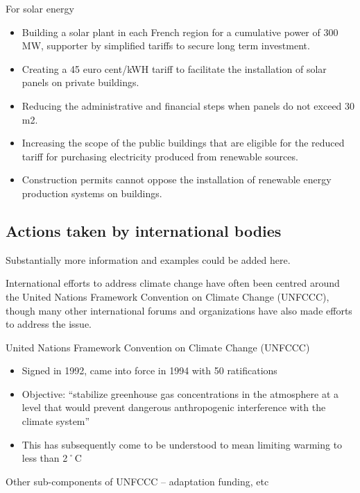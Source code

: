 For solar energy
\begin{itemize}
	\item Building a solar plant in each French region for a cumulative power of 300 MW, supporter by simplified tariffs to secure long term investment.
	\item Creating a 45 euro cent/kWH tariff to facilitate the installation of solar panels on private buildings.
	\item Reducing the administrative and financial steps when panels do not exceed 30 m2.
	\item Increasing the scope of the public buildings that are eligible for the reduced tariff for purchasing electricity produced from renewable sources.
	\item Construction permits cannot oppose the installation of renewable energy production systems on buildings.
\end{itemize}



		\subsection{Actions taken by international bodies}
		
\begin{vcom}
	Substantially more information and examples could be added here.
\end{vcom}

International efforts to address climate change have often been centred around the United Nations Framework Convention on Climate Change (UNFCCC), though many other international forums and organizations have also made efforts to address the issue.

United Nations Framework Convention on Climate Change (UNFCCC)
\begin{itemize}
	\item Signed in 1992, came into force in 1994 with 50 ratifications
	\item Objective: ``stabilize greenhouse gas concentrations in the atmosphere at a level that would prevent dangerous anthropogenic interference with the climate system''
	\item This has subsequently come to be understood to mean limiting warming to less than 2˚C
\end{itemize}
	

\begin{vcom}
	Other sub-components of UNFCCC – adaptation funding, etc
\end{vcom}	






